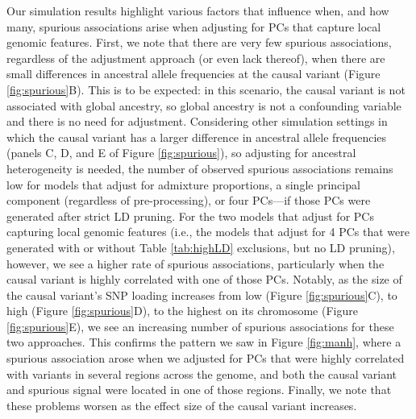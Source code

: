 \documentclass[12pt]{article}
\begin{document}
Our simulation results highlight various factors that influence when, and how many, spurious associations arise when adjusting for PCs that capture local genomic features.
First, we note that there are very few spurious associations, regardless of the adjustment approach (or even lack thereof), when there are small differences in ancestral allele frequencies at the causal variant (Figure \ref{fig:spurious}B). 
This is to be expected: in this scenario, the causal variant is not associated with global ancestry, so global ancestry is not a confounding variable  and there is no need for adjustment.
Considering other simulation settings in which the causal variant has a larger difference in ancestral allele frequencies (panels C, D, and E of Figure \ref{fig:spurious}), so adjusting for ancestral heterogeneity is needed, the number of observed spurious associations remains low for models that adjust for admixture proportions, a single principal component (regardless of pre-processing), or four PCs---if those PCs were  generated after strict LD pruning.
For the two models that adjust for PCs capturing local genomic features (i.e., the models that adjust for 4 PCs that were generated with or without Table \ref{tab:highLD} exclusions, but no LD pruning), however, we see a higher rate of spurious associations, particularly when the causal variant is highly correlated with one of those PCs.
Notably, as the size of the causal variant's SNP loading increases from low (Figure \ref{fig:spurious}C), to high (Figure \ref{fig:spurious}D), to the highest on its chromosome (Figure \ref{fig:spurious}E), we see an increasing number of spurious associations for these two approaches.
This confirms the pattern we saw in Figure \ref{fig:manh}, where a spurious association arose when we adjusted for PCs that were highly correlated with variants in several regions across the genome, and both the causal variant and spurious signal were located in one of those regions. 
Finally, we note that these problems worsen as the effect size of the causal variant increases.
\end{document}
